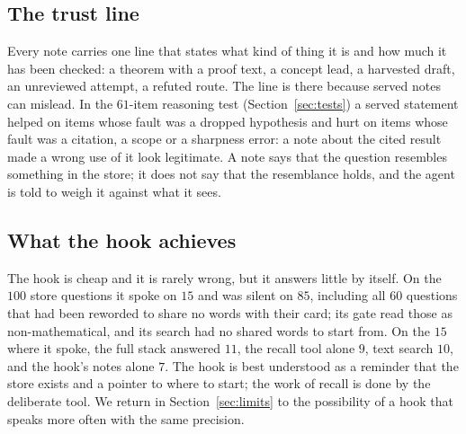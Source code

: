\subsection{The trust line}
Every note carries one line that states what kind of thing it is and how much it has been checked: a theorem with a proof text, a concept lead, a harvested draft, an unreviewed attempt, a refuted route. The line is there because served notes can mislead. In the $61$-item reasoning test (Section~\ref{sec:tests}) a served statement helped on items whose fault was a dropped hypothesis and hurt on items whose fault was a citation, a scope or a sharpness error: a note about the cited result made a wrong use of it look legitimate. A note says that the question resembles something in the store; it does not say that the resemblance holds, and the agent is told to weigh it against what it sees.

\subsection{What the hook achieves}
The hook is cheap and it is rarely wrong, but it answers little by itself. On the $100$ store questions it spoke on $15$ and was silent on $85$, including all $60$ questions that had been reworded to share no words with their card; its gate read those as non-mathematical, and its search had no shared words to start from. On the $15$ where it spoke, the full stack answered $11$, the recall tool alone $9$, text search $10$, and the hook's notes alone $7$. The hook is best understood as a reminder that the store exists and a pointer to where to start; the work of recall is done by the deliberate tool. We return in Section~\ref{sec:limits} to the possibility of a hook that speaks more often with the same precision.
